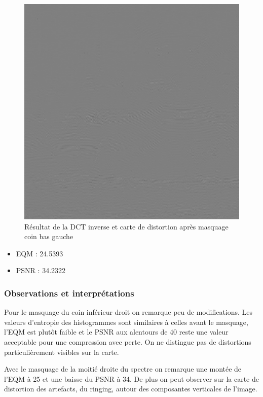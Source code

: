 \documentclass[12pt]{report}
\begin{document}
\begin{figure}[H]
\begin{center}
\includegraphics[scale=0.4]{../ImageRes/idct_masked2_disto.jpg} 
\caption{Résultat de la DCT inverse et carte de distortion après masquage coin bas gauche}
\end{center}
\end{figure}

\begin{itemize}
\item EQM : 24.5393
\item PSNR : 34.2322
\end{itemize}

\subsubsection{Observations et interprétations}
Pour le masquage du coin inférieur droit on remarque peu de modifications. Les valeurs d'entropie des histogrammes sont similaires à celles avant le masquage, l'EQM est plutôt faible et le PSNR aux alentours de 40 reste une valeur acceptable pour une compression avec perte. On ne distingue pas de distortions particulièrement visibles sur la carte.

Avec le masquage de la moitié droite du spectre on remarque une montée de l'EQM à 25 et une baisse du PSNR à 34. De plus on peut observer sur la carte de distortion des artefacts, du ringing, autour des composantes verticales de l'image.
\end{document}
